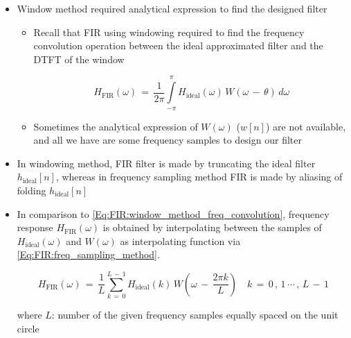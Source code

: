 \documentclass[12pt,a4paper]{book}
\begin{document}
\begin{itemize}
    \item Window method required analytical expression to find the designed filter
    
       \begin{itemize}
           \item Recall that FIR using windowing required to find the frequency convolution operation between the ideal approximated filter and the DTFT of the window
           
           \begin{equation}
               H_{\text{FIR}}(\omega) \, = \, \displaystyle\frac{1}{2 \pi} \displaystyle\int\limits_{-\pi}^{\pi} H_{\text{ideal}}(\omega) \,  W(\omega \, - \, \theta) \,  d\omega
               \label{Eq:FIR:window_method_freq_convolution}
           \end{equation}
           
           
    \item Sometimes the analytical expression of $W(\omega)$ ($w[n]$) are not available, and all we have are some frequency samples to design our filter
           
       \end{itemize}
    

\item In windowing method, FIR filter is made by truncating the ideal filter $h_{\text{ideal}}[n]$, whereas in frequency sampling method FIR is made by aliasing of folding $h_{\text{ideal}}[n]$

\item In comparison to \autoref{Eq:FIR:window_method_freq_convolution}, frequency response $H_{\text{FIR}}(\omega)$ is obtained by interpolating between the samples of $H_{\text{ideal}}(\omega)$ and $W(\omega)$ as interpolating function via \autoref{Eq:FIR:freq_sampling_method}.

\begin{equation}
               H_{\text{FIR}}(\omega) \, = \, \displaystyle\frac{1}{L} \displaystyle\sum\limits_{k \, = \, 0}^{L \, - \, 1} H_{\text{ideal}}(k) \,  W \left(\omega \, - \, \displaystyle\frac{2 \pi k}{L} \right)
                \quad k \, = \, 0 \, , \, 1 \, \cdots \, , \, L \, - \, 1
                \label{Eq:FIR:freq_sampling_method}
           \end{equation}
    
where $L$: number of the given frequency samples equally spaced on the unit circle     
    
\end{itemize}
\end{document}
